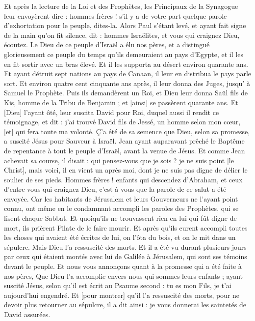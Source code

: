 \begin{multicols}{2}
Et après la lecture de la Loi et des Prophètes, les Principaux de la Synagogue leur envoyèrent dire : hommes frères ! s'il y a de votre part quelque parole d'exhortation pour le peuple, dites-la.
Alors Paul s'étant levé, et ayant fait signe de la main qu'on fit silence, dit : hommes Israëlites, et vous qui craignez Dieu, écoutez.
Le Dieu de ce peuple d'Israël a élu nos pères, et a distingué glorieusement ce peuple du temps qu'ils demeuraient au pays d'Egypte, et il les en fit sortir avec un bras élevé.
Et il les supporta au désert environ quarante ans.
Et ayant détruit sept nations au pays de Canaan, il leur en distribua le pays parle sort.
Et environ quatre cent cinquante ans après, il leur donna des Juges, jusqu' à Samuel le Prophète.
Puis ils demandèrent un Roi, et Dieu leur donna Saül fils de Kis, homme de la Tribu de Benjamin ; et [ainsi] se passèrent quarante ans.
Et [Dieu] l'ayant ôté, leur suscita David pour Roi, duquel aussi il rendit ce témoignage, et dit : j'ai trouvé David fils de Jessé, un homme selon mon cœur, [et] qui fera toute ma volonté.
Ç'a été de sa semence que Dieu, selon sa promesse, a suscité Jésus pour Sauveur à Israël.
Jean ayant auparavant prêché le Baptême de repentance à tout le peuple d'Israël, avant la venue de Jésus.
Et comme Jean achevait sa course, il disait : qui pensez-vous que je sois ? je ne suis point [le Christ], mais voici, il en vient un après moi, dont je ne suis pas digne de délier le soulier de ses pieds.
Hommes frères ! enfants qui descendez d'Abraham, et ceux d'entre vous qui craignez Dieu, c'est à vous que la parole de ce salut a été envoyée.
Car les habitants de Jérusalem et leurs Gouverneurs ne l'ayant point connu, ont même en le condamnant accompli les paroles des Prophètes, qui se lisent chaque Sabbat.
Et quoiqu'ils ne trouvassent rien en lui qui fût digne de mort, ils prièrent Pilate de le faire mourir.
Et après qu'ils eurent accompli toutes les choses qui avaient été écrites de lui, on l'ôta du bois, et on le mit dans un sépulcre.
Mais Dieu l'a ressuscité des morts.
Et il a été vu durant plusieurs jours par ceux qui étaient montés avec lui de Galilée à Jérusalem, qui sont ses témoins devant le peuple.
Et nous vous annonçons quant à la promesse qui a été faite à nos pères,
Que Dieu l'a accomplie envers nous qui sommes leurs enfants ; ayant suscité Jésus, selon qu'il est écrit au Psaume second : tu es mon Fils, je t'ai aujourd'hui engendré.
Et [pour montrer] qu'il l'a ressuscité des morts, pour ne devoir plus retourner au sépulcre, il a dit ainsi : je vous donnerai les saintetés de David assurées.

\end{multicols}
